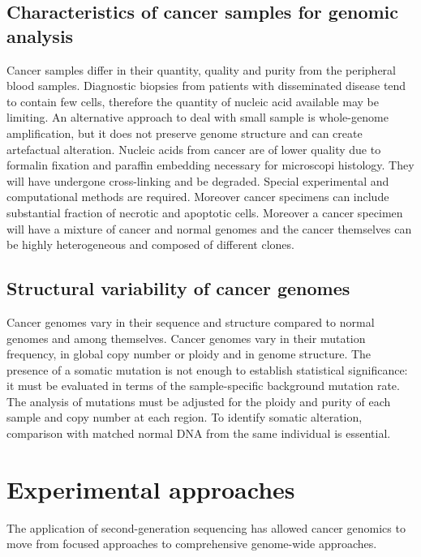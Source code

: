 	\subsection{Characteristics of cancer samples for genomic analysis}
	Cancer samples differ in their quantity, quality and purity from the peripheral blood samples.
	Diagnostic biopsies from patients with disseminated disease tend to contain few cells, therefore the quantity of nucleic acid available may be limiting.
	An alternative approach to deal with small sample is whole-genome amplification, but it does not preserve genome structure and can create artefactual alteration.
	Nucleic acids from cancer are of lower quality due to formalin fixation and paraffin embedding necessary for microscopi histology.
	They will have undergone cross-linking and be degraded.
	Special experimental and computational methods are required.
	Moreover cancer specimens can include substantial fraction of necrotic and apoptotic cells.
	Moreover a cancer specimen will have a mixture of cancer and normal genomes and the cancer themselves can be highly heterogeneous and composed of different clones.

	\subsection{Structural variability of cancer genomes}
	Cancer genomes vary in their sequence and structure compared to normal genomes and among themselves.
	Cancer genomes vary in their mutation frequency, in global copy number or ploidy and in genome structure.
	The presence of a somatic mutation is not enough to establish statistical significance: it must be evaluated in terms of the sample-specific background mutation rate.
	The analysis of mutations must be adjusted for the ploidy and purity of each sample and copy number at each region.
	To identify somatic alteration, comparison with matched normal DNA from the same individual is essential.

\section{Experimental approaches}
The application of second-generation sequencing has allowed cancer genomics to move from focused approaches to comprehensive genome-wide approaches.

